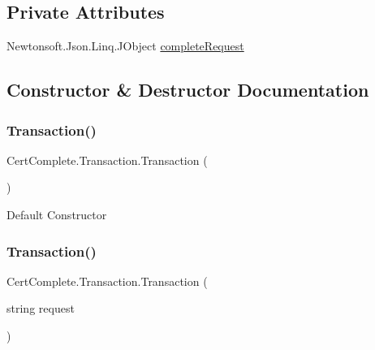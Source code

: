 \subsection*{Private Attributes}
\begin{DoxyCompactItemize}
\item 
Newtonsoft.\+Json.\+Linq.\+J\+Object \mbox{\hyperlink{class_cert_complete_1_1_transaction_a12fd763cddcfee8900bbc87b2473bdf5}{complete\+Request}}
\end{DoxyCompactItemize}


\subsection{Constructor \& Destructor Documentation}
\mbox{\label{class_cert_complete_1_1_transaction_afb2b05f628573e5439852eca5b5b80f1}} 
\subsubsection{\texorpdfstring{Transaction()}{Transaction()}\hspace{0.1cm}{\footnotesize\ttfamily [1/4]}}
{\footnotesize\ttfamily Cert\+Complete.\+Transaction.\+Transaction (\begin{DoxyParamCaption}{ }\end{DoxyParamCaption})\hspace{0.3cm}{\ttfamily [inline]}}



Default Constructor 

\mbox{\label{class_cert_complete_1_1_transaction_ae860fc76ec20cde74cdcaef8b2ba58f0}} 
\subsubsection{\texorpdfstring{Transaction()}{Transaction()}\hspace{0.1cm}{\footnotesize\ttfamily [2/4]}}
{\footnotesize\ttfamily Cert\+Complete.\+Transaction.\+Transaction (\begin{DoxyParamCaption}\item[{string}]{request }\end{DoxyParamCaption})\hspace{0.3cm}{\ttfamily [inline]}}



